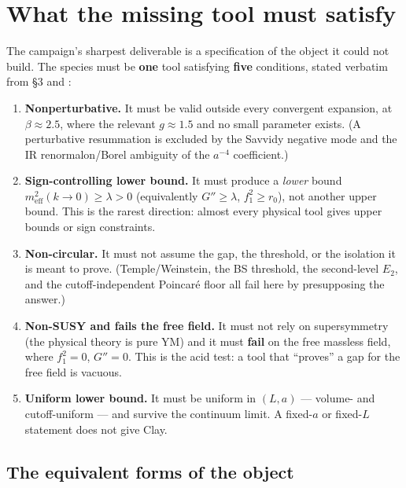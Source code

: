 \section{What the missing tool must satisfy}
\label{sec:missing}

The campaign's sharpest deliverable is a specification of the object it could not build. The
species must be \textbf{one} tool satisfying \textbf{five} conditions, stated verbatim from
 \S3 and :

\begin{enumerate}
\item \textbf{Nonperturbative.} It must be valid outside every convergent expansion, at
  $\beta\approx2.5$, where the relevant $g\approx1.5$ and no small parameter exists. (A
  perturbative resummation is excluded by the Savvidy negative mode and the IR renormalon/Borel
  ambiguity of the $a^{-4}$ coefficient.)
\item \textbf{Sign-controlling lower bound.} It must produce a \emph{lower} bound
  $m_{\mathrm{eff}}^2(k\to0)\ge\lambda>0$ (equivalently $G''\ge\lambda$, $f_1^2\ge r_0$), not
  another upper bound. This is the rarest direction: almost every physical tool gives upper
  bounds or sign constraints.
\item \textbf{Non-circular.} It must not assume the gap, the threshold, or the isolation it is
  meant to prove. (Temple/Weinstein, the BS threshold, the second-level $E_2$, and the
  cutoff-independent Poincaré floor all fail here by presupposing the answer.)
\item \textbf{Non-SUSY and fails the free field.} It must not rely on supersymmetry (the physical
  theory is pure YM) and it must \textbf{fail} on the free massless field, where $f_1^2=0$,
  $G''=0$. This is the acid test: a tool that ``proves'' a gap for the free field is vacuous.
\item \textbf{Uniform lower bound.} It must be uniform in $(L,a)$ --- volume- and
  cutoff-uniform --- and survive the continuum limit. A fixed-$a$ or fixed-$L$ statement does not
  give Clay.
\end{enumerate}

\subsection{The equivalent forms of the object}


